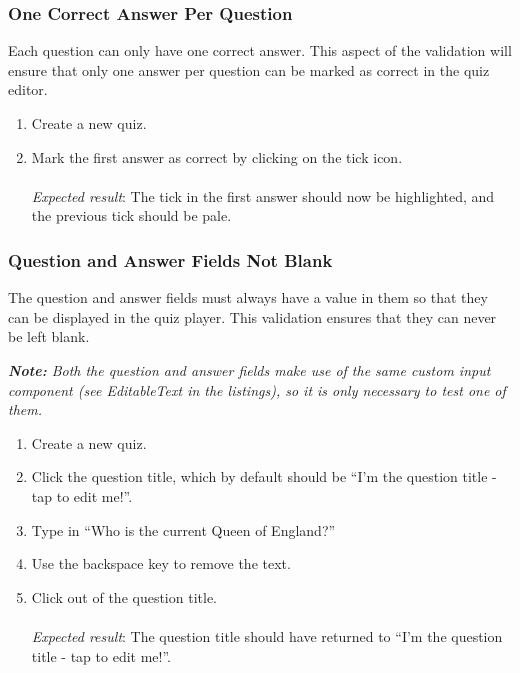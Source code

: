 \subsubsection{One Correct Answer Per Question} %
\label{ssub:one_correct_answer_}
Each question can only have one correct answer. This aspect of the validation will ensure that only one answer per question can be marked as correct in the quiz editor.
\begin{enumerate}[leftmargin=*]
  \item Create a new quiz.
  \item Mark the first answer as correct by clicking on the tick icon.\\\\
  \textit{Expected result}: The tick in the first answer should now be highlighted, and the previous tick should be pale.
\end{enumerate}

\subsubsection{Question and Answer Fields Not Blank} %
\label{ssub:quiz_fields_not_blank}
The question and answer fields must always have a value in them so that they can be displayed in the quiz player. This validation ensures that they can never be left blank.

\textit{\textbf{Note:} Both the question and answer fields make use of the same custom input component (see EditableText in the listings), so it is only necessary to test one of them.}

\begin{enumerate}[leftmargin=*]
  \item Create a new quiz.
  \item Click the question title, which by default should be ``I'm the question title - tap to edit me!''.
  \item Type in ``Who is the current Queen of England?''
  \item Use the backspace key to remove the text.
  \item Click out of the question title.\\\\
  \textit{Expected result}: The question title should have returned to ``I'm the question title - tap to edit me!''.
\end{enumerate}

